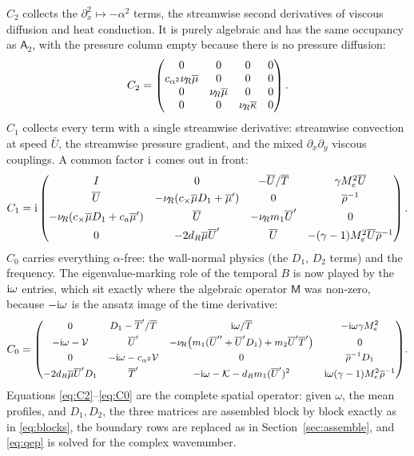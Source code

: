 \documentclass[11pt]{article}
\begin{document}
$C_2$ collects the $\partial_x^2\mapsto-\alpha^2$ terms, the streamwise second derivatives of
viscous diffusion and heat conduction. It is purely algebraic and has the same occupancy as
$\mathsf A_2$, with the pressure column empty because there is no pressure diffusion:
\begin{equation}\label{eq:C2}
  C_2=
  \begin{pmatrix}
    0 & 0 & 0 & 0\\
    c_{\alpha^2}\nu_{\!R}\overline{\mu} & 0 & 0 & 0\\
    0 & \nu_{\!R}\overline{\mu} & 0 & 0\\
    0 & 0 & \nu_{\!R}\overline{\kappa} & 0
  \end{pmatrix}.
\end{equation}
$C_1$ collects every term with a single streamwise derivative: streamwise convection at speed
$\bar U$, the streamwise pressure gradient, and the mixed $\partial_x\partial_y$ viscous
couplings. A common factor $\mathrm{i}$ comes out in front:
\begin{equation}\label{eq:C1}
  C_1=\mathrm{i}
  \begin{pmatrix}
    I & 0 & -\overline{U}/\overline{T} & \gamma M_e^2\overline{U}\\[3pt]
    \overline{U} & -\nu_{\!R}(c_\times\overline{\mu} D_1+\overline{\mu}') & 0 & \overline{\rho}^{-1}\\[3pt]
    -\nu_{\!R}(c_\times\overline{\mu} D_1+c_a\overline{\mu}') & \overline{U} & -\nu_{\!R} m_1\overline{U}' & 0\\[3pt]
    0 & -2d_R\overline{\mu}\overline{U}' & \overline{U} & -(\gamma-1)M_e^2\overline{U}\overline{\rho}^{-1}
  \end{pmatrix}.
\end{equation}
$C_0$ carries everything $\alpha$-free: the wall-normal physics (the $D_1$, $D_2$ terms) and the
frequency. The eigenvalue-marking role of the temporal $B$ is now played by the $\mathrm{i}\omega$
entries, which sit exactly where the algebraic operator $\mathsf M$ was non-zero, because
$-\mathrm{i}\omega$ is the ansatz image of the time derivative:
\begin{equation}\label{eq:C0}
  C_0={\small
  \begin{pmatrix}
    0 & D_1-\overline{T}'/\overline{T} & \mathrm{i}\omega/\overline{T} & -\mathrm{i}\omega\gamma M_e^2\\[3pt]
    -\mathrm{i}\omega-\mathcal V & \overline{U}' & -\nu_{\!R}\big(m_1(\overline{U}''+\overline{U}'D_1)+m_2\overline{U}'\overline{T}'\big) & 0\\[3pt]
    0 & -\mathrm{i}\omega-c_{\alpha^2}\mathcal V & 0 & \overline{\rho}^{-1}D_1\\[3pt]
    -2d_R\overline{\mu}\overline{U}'D_1 & \overline{T}' & -\mathrm{i}\omega-\mathcal K-d_Rm_1(\overline{U}')^2 & \mathrm{i}\omega(\gamma-1)M_e^2\overline{\rho}^{-1}
  \end{pmatrix}}.
\end{equation}
Equations \eqref{eq:C2}--\eqref{eq:C0} are the complete spatial operator: given $\omega$, the mean
profiles, and $D_1,D_2$, the three matrices are assembled block by block exactly as in
\eqref{eq:blocks}, the boundary rows are replaced as in Section~\ref{sec:assemble}, and
\eqref{eq:qep} is solved for the complex wavenumber.
\end{document}
